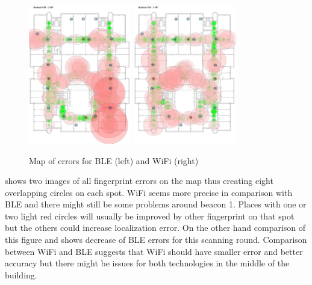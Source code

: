 \begin{figure}[h!]
	\begin{centering}
		\includegraphics[width=0.4\textwidth]{img/third_data_collection_ble_errors}
		\includegraphics[width=0.4\textwidth]{img/third_data_collection_wifi_errors}
		\par\end{centering}
	\caption{Map of errors for BLE (left) and WiFi (right)}
	\label{fig03c06}
\end{figure}

 shows two images of all fingerprint errors on the map thus creating eight overlapping circles on each spot. WiFi seems more precise in comparison with BLE and there might still be some problems around beacon 1. Places with one or two light red circles will usually be improved by other fingerprint on that spot but the others could increase localization error. On the other hand comparison of this figure and  shows decrease of BLE errors for this scanning round. Comparison between WiFi and BLE suggests that WiFi should have smaller error and better accuracy but there might be issues for both technologies in the middle of the building.

